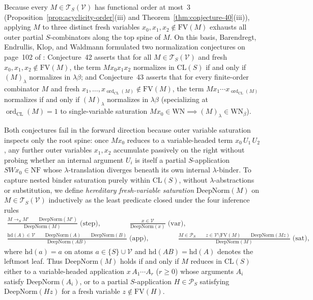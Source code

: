 \documentclass[11pt,reqno]{amsart}
\numberwithin{equation}{section}
\theoremstyle{plain}
\theoremstyle{definition}
\theoremstyle{remark}
\DeclareMathOperator{\ord}{ord}
\newcommand{\CLS}{\mathrm{CL}(S)}
\newcommand{\TSV}{\mathcal{T}_S(\mathcal{V})}
\newcommand{\NF}{\mathrm{NF}}
\newcommand{\WN}{\mathrm{WN}}
\newcommand{\redS}{\to_S}
\begin{document}
Because every $M \in \TSV$ has functional order at most~$3$ (Proposition~\ref{prop:acyclicity-order}(iii) and Theorem~\ref{thm:conjecture-40}(iii)), applying $M$ to three distinct fresh variables $x_0, x_1, x_2 \notin \mathrm{FV}(M)$ exhausts all outer partial $S$-combinators along the top spine of $M$. On this basis, Barendregt, Endrullis, Klop, and Waldmann formulated two normalization conjectures on page~102 of \cite{BarendregtEndrullisKlopWaldmann2017}: Conjecture~42 asserts that for all $M \in \TSV$ and fresh $x_0, x_1, x_2 \notin \mathrm{FV}(M)$, the term $M x_0 x_1 x_2$ normalizes in $\CLS$ if and only if $(M)_\lambda$ normalizes in $\lambda\beta$; and Conjecture~43 asserts that for every finite-order combinator $M$ and fresh $x_1, \dots, x_{\ord_{\mathrm{CL}}(M)} \notin \mathrm{FV}(M)$, the term $M x_1 \cdots x_{\ord_{\mathrm{CL}}(M)}$ normalizes if and only if $(M)_\lambda$ normalizes in $\lambda\beta$ (specializing at $\ord_{\mathrm{CL}}(M) = 1$ to single-variable saturation $M x_0 \in \WN \implies (M)_\lambda \in \WN_\beta$).

Both conjectures fail in the forward direction because outer variable saturation inspects only the root spine: once $M x_0$ reduces to a variable-headed term $x_0\,U_1\,U_2$, any further outer variables $x_1, x_2$ accumulate passively on the right without probing whether an internal argument $U_i$ is itself a partial $S$-application $S W x_0 \in \NF$ whose $\lambda$-translation diverges beneath its own internal $\lambda$-binder. To capture nested binder saturation purely within $\CLS$, without $\lambda$-abstractions or substitution, we define \emph{hereditary fresh-variable saturation} $\mathrm{DeepNorm}(M)$ on $M \in \TSV$ inductively as the least predicate closed under the four inference rules
\begin{equation}\label{eq:deepnorm-rules}
\begin{gathered}
  \frac{M \redS M' \qquad \mathrm{DeepNorm}(M')}{\mathrm{DeepNorm}(M)} \;\textrm{(step)},
  \qquad\qquad
  \frac{x \in \mathcal{V}}{\mathrm{DeepNorm}(x)} \;\textrm{(var)}, \\[0.8ex]
  \frac{\mathrm{hd}(A) \in \mathcal{V} \qquad \mathrm{DeepNorm}(A) \qquad \mathrm{DeepNorm}(B)}{\mathrm{DeepNorm}(A B)} \;\textrm{(app)},
  \qquad\qquad
  \frac{M \in \mathcal{P}_S \qquad z \in \mathcal{V} \setminus \mathrm{FV}(M) \qquad \mathrm{DeepNorm}(M z)}{\mathrm{DeepNorm}(M)} \;\textrm{(sat)},
\end{gathered}
\end{equation}
where $\mathrm{hd}(a) = a$ on atoms $a \in \{S\} \cup \mathcal{V}$ and $\mathrm{hd}(A B) = \mathrm{hd}(A)$ denotes the leftmost leaf. Thus $\mathrm{DeepNorm}(M)$ holds if and only if $M$ reduces in $\CLS$ either to a variable-headed application $x\,A_1 \cdots A_r$ ($r \ge 0$) whose arguments $A_i$ satisfy $\mathrm{DeepNorm}(A_i)$, or to a partial $S$-application $H \in \mathcal{P}_S$ satisfying $\mathrm{DeepNorm}(H z)$ for a fresh variable $z \notin \mathrm{FV}(H)$.
\end{document}
